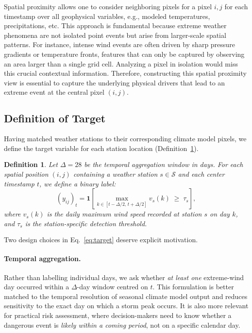 \documentclass{article}
\newtheorem{definition}{Definition}[section]
\begin{document}
Spatial proximity allows one to consider neighboring pixels for a pixel $i, j$ for each timestamp over all geophysical variables, e.g., modeled temperatures, precipitations, etc. This approach is fundamental because extreme weather phenomena are not isolated point events but arise from larger-scale spatial patterns. For instance, intense wind events are often driven by sharp pressure gradients or temperature fronts, features that can only be captured by observing an area larger than a single grid cell. Analyzing a pixel in isolation would miss this crucial contextual information. Therefore, constructing this spatial proximity view is essential to capture the underlying physical drivers that lead to an extreme event at the central pixel $(i, j)$.

\subsection{Definition of Target}

Having matched weather stations to their corresponding climate model pixels, we define the target variable for each station location (Definition~\ref{def:target_variable}).

\begin{definition}
\label{def:target_variable}
Let $\Delta = 28$ be the temporal aggregation window in days. For each spatial position $(i, j)$ containing a weather station $s \in \mathcal{S}$ and each center timestamp $t$, we define a binary label:
\begin{equation}
    (y_{ij})_t = \mathbf{1}\!\left[\max_{k \in [t-\Delta/2,\, t+\Delta/2]} v_s(k) \;\geq\; \tau_s\right],
    \label{eq:target}
\end{equation}
where $v_s(k)$ is the daily maximum wind speed recorded at station $s$ on day $k$, and $\tau_s$ is the station-specific detection threshold.
\end{definition}

Two design choices in Eq.~\ref{eq:target} deserve explicit motivation.

\paragraph{Temporal aggregation.} Rather than labelling individual days, we ask whether \emph{at least one} extreme-wind day occurred within a $\Delta$-day window centred on $t$. This formulation is better matched to the temporal resolution of seasonal climate model output and reduces sensitivity to the exact day on which a storm peak occurs. It is also more relevant for practical risk assessment, where decision-makers need to know whether a dangerous event is \emph{likely within a coming period}, not on a specific calendar day.
\end{document}
